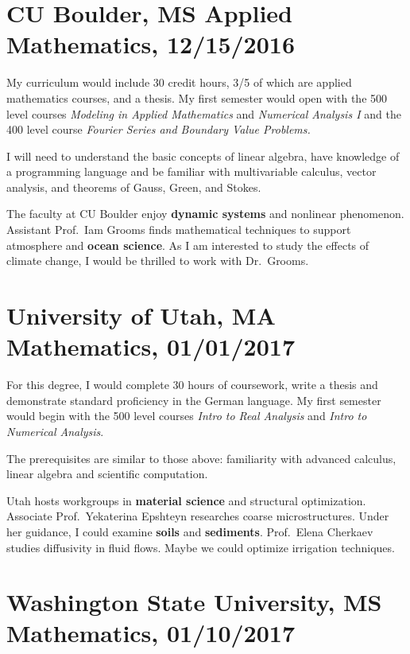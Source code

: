 \documentclass{article}
\newcommand{\look}{}
\newcommand{\like}{\textbf}
\begin{document}
\section*{CU Boulder, MS Applied Mathematics, 12/15/2016}

	My curriculum would include 30 credit hours, 3/5 of which are applied mathematics courses, and a thesis. My first semester would open with the 500 level courses \emph{Modeling in Applied Mathematics} and \emph{Numerical Analysis I} and the 400 level course \emph{Fourier Series and Boundary Value Problems.} 

	I will need to understand the basic concepts of \look{linear algebra}, have knowledge of a \look{programming language} and be familiar with \look{multivariable calculus}, vector analysis, and theorems of Gauss, Green, and Stokes.

	The faculty at CU Boulder enjoy \like{dynamic systems} and nonlinear phenomenon. Assistant Prof.\ Iam Grooms finds mathematical techniques to support atmosphere and \like{ocean science}. As I am interested to study the effects of climate change, I would be thrilled to work with Dr.\ Grooms.

\section*{University of Utah, MA Mathematics, 01/01/2017}

	For this degree, I would complete 30 hours of coursework, write a thesis and demonstrate standard proficiency in the German language. My first semester would begin with the 500 level courses \emph{Intro to Real Analysis} and \emph{Intro to Numerical Analysis}. 

	The prerequisites are similar to those above: familiarity with \look{advanced calculus}, \look{linear algebra} and \look{scientific computation}.

	Utah hosts workgroups in \like{material science} and structural optimization. Associate Prof.\ Yekaterina Epshteyn researches coarse microstructures. Under her guidance, I could examine \like{soils} and \like{sediments}. Prof.\ Elena Cherkaev studies diffusivity in fluid flows. Maybe we could optimize irrigation techniques.

\section*{Washington State University, MS Mathematics, 01/10/2017}
\end{document}
